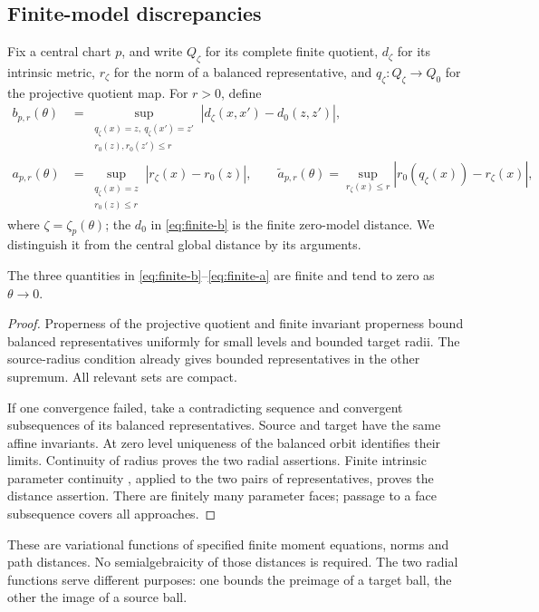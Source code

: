 \subsection{Finite-model discrepancies}
Fix a central chart \(p\), and write \(Q_\zeta\) for its complete
finite quotient, \(d_\zeta\) for its intrinsic metric, \(r_\zeta\)
for the norm of a balanced representative, and
\(q_\zeta:Q_\zeta\to Q_0\) for the projective quotient map.
For \(r>0\), define
\begin{align}
 b_{p,r}(\theta)
 &=\sup_{\substack{q_\zeta(x)=z,\ q_\zeta(x')=z'\\
                         r_0(z),r_0(z')\le r}}
       |d_\zeta(x,x')-d_0(z,z')|,\label{eq:finite-b}\\
 a_{p,r}(\theta)
 &=\sup_{\substack{q_\zeta(x)=z\\r_0(z)\le r}}
       |r_\zeta(x)-r_0(z)|,\qquad
 \widetilde a_{p,r}(\theta)
 =\sup_{r_\zeta(x)\le r}|r_0(q_\zeta(x))-r_\zeta(x)|,
 \label{eq:finite-a}
\end{align}
where \(\zeta=\zeta_p(\theta)\); the \(d_0\) in
\eqref{eq:finite-b} is the finite zero-model distance.
We distinguish it from the central global distance by its arguments.

\begin{lemma}\label{lem:discrepancies}
The three quantities in \eqref{eq:finite-b}--\eqref{eq:finite-a}
are finite and tend to zero as \(\theta\to0\).
\end{lemma}

\begin{proof}
Properness of the projective quotient and finite invariant
properness bound balanced representatives uniformly for small
levels and bounded target radii. The source-radius condition
already gives bounded representatives in the other supremum.
All relevant sets are compact.

If one convergence failed, take a contradicting sequence and
convergent subsequences of its balanced representatives.
Source and target have the same affine invariants. At zero level
uniqueness of the balanced orbit identifies their limits.
Continuity of radius proves the two radial assertions. Finite
intrinsic parameter continuity
\cite[Theorem~5.1]{wuebben14}, applied to the two pairs of
representatives, proves the distance assertion. There are finitely
many parameter faces; passage to a face subsequence covers all
approaches.
\end{proof}

These are variational functions of specified finite moment equations,
norms and path distances. No semialgebraicity of those distances
is required. The two radial functions serve different purposes:
one bounds the preimage of a target ball, the other the image of
a source ball.

